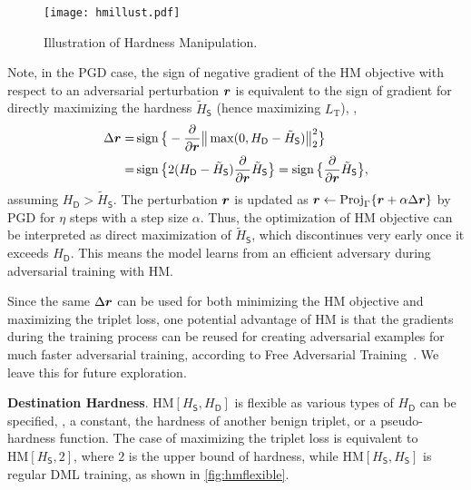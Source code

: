 \documentclass[10pt,twocolumn,letterpaper]{article}
\begin{document}
\begin{figure}
	\texttt{[image: hmillust.pdf]}
	\caption{Illustration of Hardness Manipulation.}
	\label{fig:hm}
\end{figure}


Note, in the PGD case, the sign of negative gradient of the HM objective with
respect to an adversarial perturbation ${\bm{r}}$ is equivalent to the sign of
gradient for directly maximizing the hardness $\tilde{H}_\mathsf{S}$ (hence
maximizing $L_\text{T}$), \ie,
%
\begin{align}
	\Delta {\bm{r}}
	=&
	\operatorname{sign}\big\{
		-\frac{\partial}{\partial {\bm{r}}} \big\| \max(0, 
		H_\mathsf{D} - \tilde{H}_\mathsf{S} ) \big\|_2^2
	\big\}
	\\
	=&
	\operatorname{sign}\big\{
		2(H_\mathsf{D} - \tilde{H}_\mathsf{S})
		\frac{\partial }{\partial {\bm{r}}} \tilde{H}_\mathsf{S} \big\}
	=
	\operatorname{sign}\big\{
		\frac{\partial}{\partial {\bm{r}}} \tilde{H}_\mathsf{S}
		\big\},
\end{align}
%
assuming $H_\mathsf{D}>\tilde{H}_\mathsf{S}$.
%
The perturbation ${\bm{r}}$ is updated as ${\bm{r}} \leftarrow \text{Proj}_\Gamma\{{\bm{r}} + \alpha \Delta
{\bm{r}}\}$ by PGD for $\eta$ steps with a step size $\alpha$.
%
Thus, the optimization of HM objective can be interpreted as direct
maximization of $\tilde{H}_\mathsf{S}$, which discontinues very early once it
exceeds $H_\mathsf{D}$.
%
This means the model learns from an efficient adversary during adversarial
training with HM.

Since the same $\Delta{\bm{r}}$ can be used for both minimizing the HM objective
and maximizing the triplet loss, one potential advantage of HM is that
the gradients during the training process can be reused for creating
adversarial examples for much faster adversarial training, according to 
Free Adversarial Training~\cite{freeat}.
%
We leave this for future exploration.


\textbf{Destination Hardness}.
%
$\text{HM}[H_\mathsf{S},H_\mathsf{D}]$ is flexible as various
types of $H_\mathsf{D}$ can be specified, \eg, a constant, the
hardness of another benign triplet, or a pseudo-hardness function.
%
The case of maximizing the triplet loss is equivalent to
$\text{HM}[H_\mathsf{S},2]$, where $2$ is the 
upper bound of hardness, while $\text{HM}[H_\mathsf{S},H_\mathsf{S}]$
is regular DML training, as shown in \cref{fig:hmflexible}.
\end{document}
